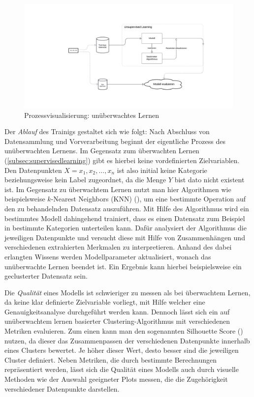 \begin{figure}[H]\label{img:unsupervisedworkflow}
	\hspace{-15mm}
	\centering
	\includegraphics[width=0.8\linewidth]{Bilder/UnsupervisedLearning.png}
	\caption{Prozessvisualisierung: unüberwachtes Lernen}
\end{figure}
Der \textit{Ablauf} des Trainigs gestaltet sich wie folgt: Nach Abschluss von Datensammlung und Vorverarbeitung beginnt der eigentliche Prozess des unüberwachten Lernens. Im Gegensatz zum überwachten Lernen (\ref{subsec:supervisedlearning}) gibt es hierbei keine vordefinierten Zielvariablen. Den Datenpunkten $X = x_1, x_2, \ldots, x_n$ ist also initial keine Kategorie beziehungsweise kein Label zugeordnet, da die Menge $Y$ bist dato nicht existent ist. Im Gegensatz zu überwachtem Lernen nutzt man hier Algorithmen wie beispielsweise \glqq $k$-Nearest Neighbors (KNN)\grqq{} (\cite[38]{joshi_machine_2020}), um eine bestimmte Operation auf den zu behandelnden Datensatz auszuführen. Mit Hilfe des Algorithmus wird ein bestimmtes Modell dahingehend trainiert, dass es einen Datensatz zum Beispiel in bestimmte Kategorien unterteilen kann. Dafür analysiert der Algorithmus die jeweiligen Datenpunkte und versucht diese mit Hilfe von Zusammenhängen und verschiedenen extrahierten Merkmalen zu interpretieren. Anhand des dabei erlangten Wissens werden Modellparameter aktualisiert, wonach das unüberwachte Lernen beendet ist. Ein Ergebnis kann hierbei beispielsweise ein \glqq geclusterter\grqq{} Datensatz sein.

Die  \textit{Qualität} eines Modells ist schwieriger zu messen als bei überwachtem Lernen, da keine klar definierte Zielvariable vorliegt, mit Hilfe welcher eine Genauigkeitsanalyse durchgeführt werden kann. Dennoch lässt sich ein auf unüberwachtem lernen basierter Clustering-Algorithmus mit verschiedenen Metriken evaluieren. Zum einen kann man den sogenannten Silhouette Score (\cite{shahapure_cluster_2020}) nutzen, da dieser das Zusammenpassen der verschiedenen Datenpunkte innerhalb eines Clusters bewertet. Je höher dieser Wert, desto besser sind die jeweiligen Cluster definiert. Neben Metriken, die durch bestimmte Berechnungen repräsentiert werden, lässt sich die Qualität eines Modells auch durch visuelle Methoden wie der Auswahl geeigneter Plots messen, die die Zugehörigkeit verschiedener Datenpunkte darstellen.
